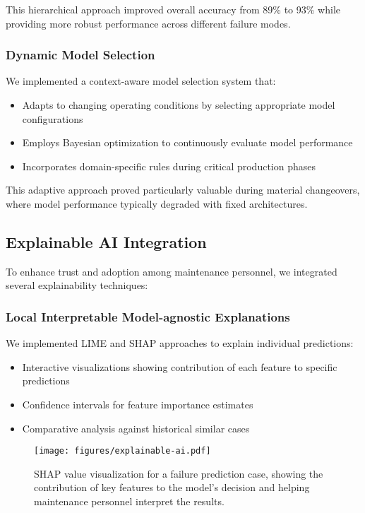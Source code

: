 This hierarchical approach improved overall accuracy from 89\% to 93\% while providing more robust performance across different failure modes.

\subsubsection{Dynamic Model Selection}
We implemented a context-aware model selection system that:
\begin{itemize}
    \item Adapts to changing operating conditions by selecting appropriate model configurations
    \item Employs Bayesian optimization to continuously evaluate model performance
    \item Incorporates domain-specific rules during critical production phases
\end{itemize}

This adaptive approach proved particularly valuable during material changeovers, where model performance typically degraded with fixed architectures.

\subsection{Explainable AI Integration}
To enhance trust and adoption among maintenance personnel, we integrated several explainability techniques:

\subsubsection{Local Interpretable Model-agnostic Explanations}
We implemented LIME and SHAP approaches to explain individual predictions:
\begin{itemize}
    \item Interactive visualizations showing contribution of each feature to specific predictions
    \item Confidence intervals for feature importance estimates
    \item Comparative analysis against historical similar cases
\end{itemize}

\begin{figure}[t]
\centering
\texttt{[image: figures/explainable-ai.pdf]}
\caption{SHAP value visualization for a failure prediction case, showing the contribution of key features to the model's decision and helping maintenance personnel interpret the results.}
\label{fig:explainable_ai}
\end{figure}

